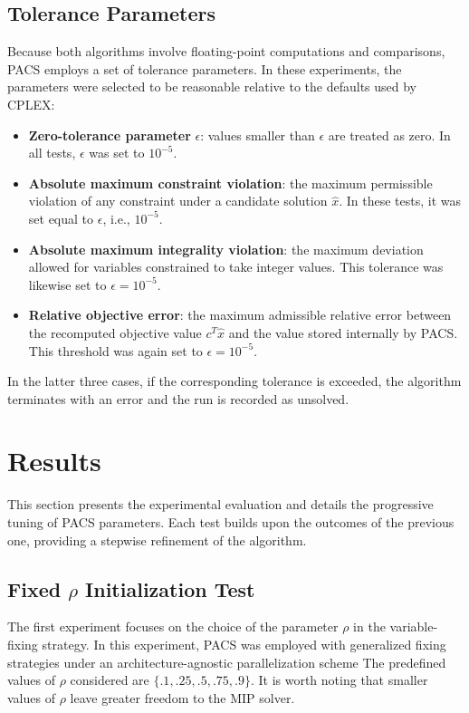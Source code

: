 \subsection{Tolerance Parameters}
Because both algorithms involve floating-point computations and comparisons, PACS employs a set of tolerance parameters. In these experiments, the parameters were selected to be reasonable relative to the defaults used by CPLEX:
\begin{itemize}
    \item \textbf{Zero-tolerance parameter} $\epsilon$: values smaller than $\epsilon$ are treated as zero. In all tests, $\epsilon$ was set to $10^{-5}$.
    \item \textbf{Absolute maximum constraint violation}: the maximum permissible violation of any constraint under a candidate solution $\hat{x}$. In these tests, it was set equal to $\epsilon$, i.e., $10^{-5}$.
    \item \textbf{Absolute maximum integrality violation}: the maximum deviation allowed for variables constrained to take integer values. This tolerance was likewise set to $\epsilon = 10^{-5}$.
    \item \textbf{Relative objective error}: the maximum admissible relative error between the recomputed objective value $c^T \hat{x}$ and the value stored internally by PACS. This threshold was again set to $\epsilon = 10^{-5}$.  
\end{itemize}  
In the latter three cases, if the corresponding tolerance is exceeded, the algorithm terminates with an error and the run is recorded as unsolved.  

\section{Results}
This section presents the experimental evaluation and details the progressive tuning of PACS parameters. Each test builds upon the outcomes of the previous one, providing a stepwise refinement of the algorithm.

\subsection{Fixed $\rho$ Initialization Test}\label{sec:test_fix_rho}
The first experiment focuses on the choice of the parameter $\rho$ in the variable-fixing strategy.  
In this experiment, PACS was employed with generalized fixing strategies under an architecture-agnostic parallelization scheme
The predefined values of $\rho$ considered are $\{.1, .25, .5, .75, .9\}$.  
It is worth noting that smaller values of $\rho$ leave greater freedom to the MIP solver.  

